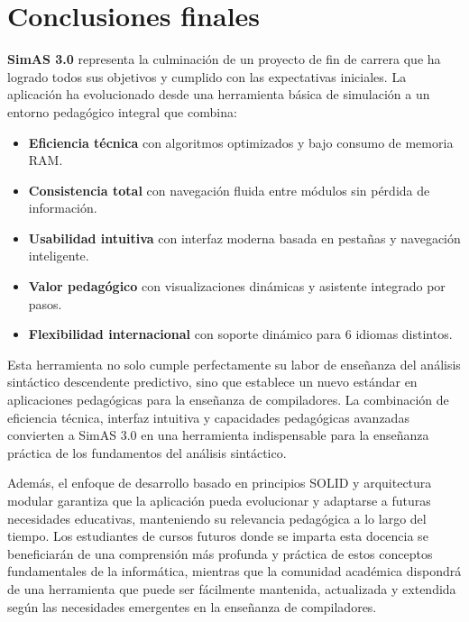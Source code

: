 \section{Conclusiones finales}

\textbf{SimAS 3.0} representa la culminación de un proyecto de fin de carrera que ha logrado todos sus objetivos y cumplido con las expectativas iniciales. La aplicación ha evolucionado desde una herramienta básica de simulación a un entorno pedagógico integral que combina:

\begin{itemize}
\item \textbf{Eficiencia técnica} con algoritmos optimizados y bajo consumo de memoria RAM.
\item \textbf{Consistencia total} con navegación fluida entre módulos sin pérdida de información.
\item \textbf{Usabilidad intuitiva} con interfaz moderna basada en pestañas y navegación inteligente.
\item \textbf{Valor pedagógico} con visualizaciones dinámicas y asistente integrado por pasos.
\item \textbf{Flexibilidad internacional} con soporte dinámico para 6 idiomas distintos.
\end{itemize}

Esta herramienta no solo cumple perfectamente su labor de enseñanza del análisis sintáctico descendente predictivo, sino que establece un nuevo estándar en aplicaciones pedagógicas para la enseñanza de compiladores. La combinación de eficiencia técnica, interfaz intuitiva y capacidades pedagógicas avanzadas convierten a SimAS 3.0 en una herramienta indispensable para la enseñanza práctica de los fundamentos del análisis sintáctico.

Además, el enfoque de desarrollo basado en principios SOLID \cite{solid-principles} y arquitectura modular garantiza que la aplicación pueda evolucionar y adaptarse a futuras necesidades educativas, manteniendo su relevancia pedagógica a lo largo del tiempo. Los estudiantes de cursos futuros donde se imparta esta docencia se beneficiarán de una comprensión más profunda y práctica de estos conceptos fundamentales de la informática, mientras que la comunidad académica dispondrá de una herramienta que puede ser fácilmente mantenida, actualizada y extendida según las necesidades emergentes en la enseñanza de compiladores.
